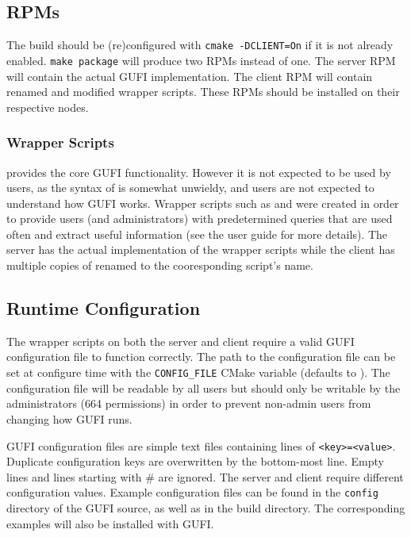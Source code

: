 \subsection{RPMs}
The build should be (re)configured with \texttt{cmake -DCLIENT=On} if
it is not already enabled. \texttt{make~package} will produce two RPMs
instead of one. The server RPM will contain the actual GUFI
implementation. The client RPM will contain renamed and modified
\guficlient wrapper scripts. These RPMs should be installed on their
respective nodes.

\subsubsection{Wrapper Scripts}
\gufiquery provides the core GUFI functionality. However it is not
expected to be used by users, as the syntax of \gufiquery is somewhat
unwieldy, and users are not expected to understand how GUFI
works. Wrapper scripts such as \gufifind and \gufils were created in
order to provide users (and administrators) with predetermined queries
that are used often and extract useful information (see the user guide
for more details). The server has the actual implementation of the
wrapper scripts while the client has multiple copies of \guficlient
renamed to the cooresponding script's name.

\subsection{Runtime Configuration}
The wrapper scripts on both the server and client require a valid GUFI
configuration file to function correctly. The path to the
configuration file can be set at configure time with the
\texttt{CONFIG\_FILE} CMake variable (defaults to
\guficonfigfile). The configuration file will be readable by all users
but should only be writable by the administrators (664 permissions) in
order to prevent non-admin users from changing how GUFI runs.

GUFI configuration files are simple text files containing lines of
\texttt{<key>=<value>}. Duplicate configuration keys are overwritten
by the bottom-most line. Empty lines and lines starting with \# are
ignored. The server and client require different configuration
values. Example configuration files can be found in the
\texttt{config} directory of the GUFI source, as well as in the build
directory. The corresponding examples will also be installed with
GUFI.

